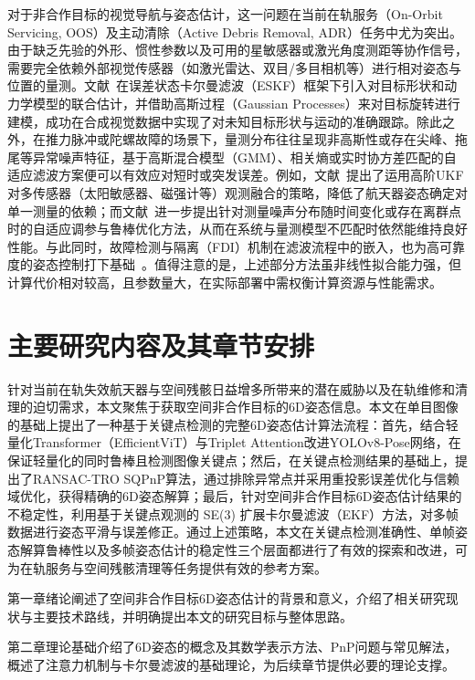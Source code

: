 对于非合作目标的视觉导航与姿态估计，这一问题在当前在轨服务（On-Orbit Servicing, OOS）及主动清除（Active Debris Removal, ADR）任务中尤为突出。由于缺乏先验的外形、惯性参数以及可用的星敏感器或激光角度测距等协作信号，需要完全依赖外部视觉传感器（如激光雷达、双目/多目相机等）进行相对姿态与位置的量测。文献~\cite{BARBIER2023144}在误差状态卡尔曼滤波（ESKF）框架下引入对目标形状和动力学模型的联合估计，并借助高斯过程（Gaussian Processes）来对目标旋转进行建模，成功在合成视觉数据中实现了对未知目标形状与运动的准确跟踪。除此之外，在推力脉冲或陀螺故障的场景下，量测分布往往呈现非高斯性或存在尖峰、拖尾等异常噪声特征，基于高斯混合模型（GMM）、相关熵或实时协方差匹配的自适应滤波方案便可以有效应对短时或突发误差。例如，文献~\cite{2022HO-UKF}提出了运用高阶UKF对多传感器（太阳敏感器、磁强计等）观测融合的策略，降低了航天器姿态确定对单一测量的依赖；而文献~\cite{kim2023gmm,Xiao_2024,AMCCKF_2023}进一步提出针对测量噪声分布随时间变化或存在离群点时的自适应调参与鲁棒优化方法，从而在系统与量测模型不匹配时依然能维持良好性能。与此同时，故障检测与隔离（FDI）机制在滤波流程中的嵌入，也为高可靠度的姿态控制打下基础~\cite{POURTAKDOUST2022134}。值得注意的是，上述部分方法虽非线性拟合能力强，但计算代价相对较高，且参数量大，在实际部署中需权衡计算资源与性能需求。

\section{主要研究内容及其章节安排}
针对当前在轨失效航天器与空间残骸日益增多所带来的潜在威胁以及在轨维修和清理的迫切需求，本文聚焦于获取空间非合作目标的6D姿态信息。本文在单目图像的基础上提出了一种基于关键点检测的完整6D姿态估计算法流程：首先，结合轻量化Transformer（EfficientViT）与Triplet Attention改进YOLOv8-Pose网络，在保证轻量化的同时鲁棒且检测图像关键点；然后，在关键点检测结果的基础上，提出了RANSAC-TRO SQPnP算法，通过排除异常点并采用重投影误差优化与信赖域优化，获得精确的6D姿态解算；最后，针对空间非合作目标6D姿态估计结果的不稳定性，利用基于关键点观测的 SE(3) 扩展卡尔曼滤波（EKF）方法，对多帧数据进行姿态平滑与误差修正。通过上述策略，本文在关键点检测准确性、单帧姿态解算鲁棒性以及多帧姿态估计的稳定性三个层面都进行了有效的探索和改进，可为在轨服务与空间残骸清理等任务提供有效的参考方案。

第一章绪论阐述了空间非合作目标6D姿态估计的背景和意义，介绍了相关研究现状与主要技术路线，并明确提出本文的研究目标与整体思路。

第二章理论基础介绍了6D姿态的概念及其数学表示方法、PnP问题与常见解法，概述了注意力机制与卡尔曼滤波的基础理论，为后续章节提供必要的理论支撑。

